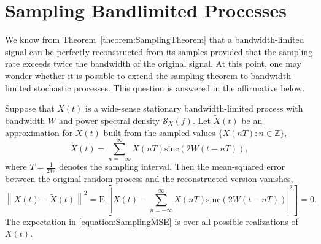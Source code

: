 \section{Sampling Bandlimited Processes}

We know from Theorem~\ref{theorem:SamplingTheorem} that a bandwidth-limited signal can be perfectly reconstructed from its samples provided that the sampling rate exceeds twice the bandwidth of the original signal.
At this point, one may wonder whether it is possible to extend the sampling theorem to bandwidth-limited stochastic processes.
This question is answered in the affirmative below.

\begin{theorem} \label{theorem:SamplingRandomSignals}
Suppose that $X(t)$ is a wide-sense stationary bandwidth-limited process with bandwidth $W$ and power spectral density $\mathcal{S}_X (f)$.
Let $\tilde{X}(t)$ be an approximation for $X(t)$ built from the sampled values $\{ X(nT) : n \in \mathbb{Z} \}$,
\begin{equation*}
\tilde{X}(t) = \sum_{n=-\infty}^{\infty} X(nT) \mathrm{sinc} (2 W (t - nT)) ,
\end{equation*}
where $T = \frac{1}{2W}$ denotes the sampling interval.
Then the mean-squared error between the original random process and the reconstructed version vanishes,
\begin{equation} \label{equation:SamplingMSE}
\left\| X(t) - \tilde{X}(t) \right\|^2
= \mathrm{E} \left[ \left| X(t) - \sum_{n=-\infty}^{\infty}
X(nT) \mathrm{sinc} (2 W (t - nT)) \right|^2 \right] = 0 .
\end{equation}
The expectation in \eqref{equation:SamplingMSE} is over all possible realizations of $X(t)$.
\end{theorem}
